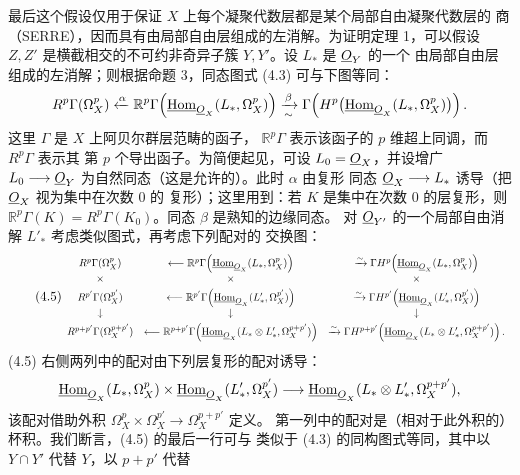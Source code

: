 最后这个假设仅用于保证 $X$ 上每个凝聚代数层都是某个局部自由凝聚代数层的
商（SERRE），因而具有由局部自由层组成的左消解。为证明定理 1，可以假设
$Z,Z'$ 是横截相交的不可约非奇异子簇 $Y,Y'$。设 $L_{*}$ 是 $\underline{O}_Y$ 的一个
由局部自由层组成的左消解；则根据命题 3，同态图式 (4.3) 可与下图等同：
\[
R^{p}\Gamma(\Omega_X^{p})
\xleftarrow{\alpha}
\mathbb R^{p}\Gamma\!\left(\underline{\operatorname{Hom}}_{\underline{O}_X}(L_{*},\Omega_X^{p})\right)
\xrightarrow[\sim]{\beta}
\Gamma\!\left(H^{p}\bigl(\underline{\operatorname{Hom}}_{\underline{O}_X}(L_{*},\Omega_X^{p})\bigr)\right).
\]
这里 $\Gamma$ 是 $X$ 上阿贝尔群层范畴的函子，
$\mathbb R^{p}\Gamma$ 表示该函子的 $p$ 维超上同调，而 $R^{p}\Gamma$ 表示其
第 $p$ 个导出函子。为简便起见，可设 $L_0=\underline{O}_X$，并设增广
$L_0\longrightarrow\underline{O}_Y$ 为自然同态（这是允许的）。此时 $\alpha$ 由复形
同态 $\underline{O}_X\longrightarrow L_{*}$ 诱导（把 $\underline{O}_X$ 视为集中在次数 $0$ 的
复形）；这里用到：若 $K$ 是集中在次数 $0$ 的层复形，则
$\mathbb R^{p}\Gamma(K)=R^{p}\Gamma(K_0)$。同态 $\beta$ 是熟知的边缘同态。
对 $\underline{O}_{Y'}$ 的一个局部自由消解 $L'_{*}$ 考虑类似图式，再考虑下列配对的
交换图：
\begin{equation}\tag{4.5}
\resizebox{\textwidth}{!}{$
\begin{array}{ccc}
R^{p}\Gamma(\Omega_X^{p})
&\longleftarrow
\mathbb R^{p}\Gamma\!\left(\Homsh_{\Osh_X}(L_{*},\Omega_X^{p})\right)
&\xrightarrow{\sim}
\Gamma H^{p}\!\left(\Homsh_{\Osh_X}(L_{*},\Omega_X^{p})\right)
\\[3pt]
\times&\times&\times\\[3pt]
R^{p'}\Gamma(\Omega_X^{p'})
&\longleftarrow
\mathbb R^{p'}\Gamma\!\left(\Homsh_{\Osh_X}(L'_{*},\Omega_X^{p'})\right)
&\xrightarrow{\sim}
\Gamma H^{p'}\!\left(\Homsh_{\Osh_X}(L'_{*},\Omega_X^{p'})\right)
\\[3pt]
\downarrow&\downarrow&\downarrow\\[3pt]
R^{p+p'}\Gamma(\Omega_X^{p+p'})
&\longleftarrow
\mathbb R^{p+p'}\Gamma\!\left(
\Homsh_{\Osh_X}(L_{*}\otimes L'_{*},\Omega_X^{p+p'})\right)
&\xrightarrow{\sim}
\Gamma H^{p+p'}\!\left(
\Homsh_{\Osh_X}(L_{*}\otimes L'_{*},\Omega_X^{p+p'})\right).
\end{array}
$}
\end{equation}
(4.5) 右侧两列中的配对由下列层复形的配对诱导：
\[
\underline{\operatorname{Hom}}_{\underline{O}_X}(L_{*},\Omega_X^{p})
\times\underline{\operatorname{Hom}}_{\underline{O}_X}(L'_{*},\Omega_X^{p'})
\longrightarrow
\underline{\operatorname{Hom}}_{\underline{O}_X}(L_{*}\otimes L'_{*},\Omega_X^{p+p'}),
\]
该配对借助外积
$\Omega_X^{p}\times\Omega_X^{p'}\longrightarrow\Omega_X^{p+p'}$ 定义。
第一列中的配对是（相对于此外积的）杯积。我们断言，(4.5) 的最后一行可与
类似于 (4.3) 的同构图式等同，其中以 $Y\cap Y'$ 代替 $Y$，以 $p+p'$ 代替
